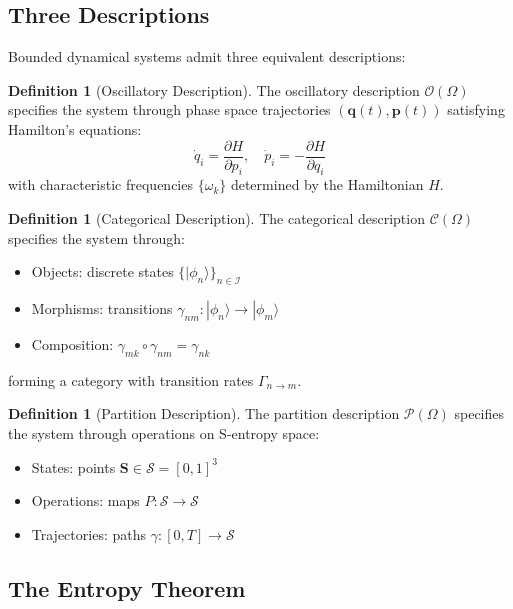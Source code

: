 \documentclass[10pt,twocolumn]{article}
\theoremstyle{plain}
\theoremstyle{definition}
\newtheorem{definition}[theorem]{Definition}
\theoremstyle{remark}
\newcommand{\Sspace}{\mathcal{S}}
\newcommand{\Scoord}{\mathbf{S}}
\newcommand{\Pcat}{\mathcal{P}}
\newcommand{\Ocat}{\mathcal{O}}
\newcommand{\Ccat}{\mathcal{C}}
\begin{document}
\subsection{Three Descriptions}

Bounded dynamical systems admit three equivalent descriptions:

\begin{definition}[Oscillatory Description]
\label{def:oscillatory}
The oscillatory description $\Ocat(\Omega)$ specifies the system through phase space trajectories $(\mathbf{q}(t), \mathbf{p}(t))$ satisfying Hamilton's equations:
\begin{equation}
\dot{q}_i = \frac{\partial H}{\partial p_i}, \quad \dot{p}_i = -\frac{\partial H}{\partial q_i}
\end{equation}
with characteristic frequencies $\{\omega_k\}$ determined by the Hamiltonian $H$.
\end{definition}

\begin{definition}[Categorical Description]
\label{def:categorical}
The categorical description $\Ccat(\Omega)$ specifies the system through:
\begin{itemize}
\item Objects: discrete states $\{|\phi_n\rangle\}_{n \in \mathcal{I}}$
\item Morphisms: transitions $\gamma_{nm}: |\phi_n\rangle \to |\phi_m\rangle$
\item Composition: $\gamma_{mk} \circ \gamma_{nm} = \gamma_{nk}$
\end{itemize}
forming a category with transition rates $\Gamma_{n \to m}$.
\end{definition}

\begin{definition}[Partition Description]
\label{def:partition}
The partition description $\Pcat(\Omega)$ specifies the system through operations on S-entropy space:
\begin{itemize}
\item States: points $\Scoord \in \Sspace = [0,1]^3$
\item Operations: maps $P: \Sspace \to \Sspace$
\item Trajectories: paths $\gamma: [0,T] \to \Sspace$
\end{itemize}
\end{definition}

\subsection{The Entropy Theorem}
\end{document}
